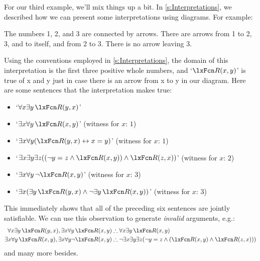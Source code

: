 For our third example, we'll mix things up a bit. In \cref{s:Interpretations}, we described how we can present some interpretations using diagrams. For example:
\begin{center}
	\begin{arialabel}{The numbers 1, 2, and 3 are connected by arrows. There are arrows from 1 to 2, 3, and to itself, and from 2 to 3. There is no arrow leaving 3.}
\end{arialabel}
\end{center}
Using the conventions employed in \cref{s:Interpretations}, the domain of this interpretation is the first three positive whole numbers, and `$\atom{R}{x,y}$' is true of x and y just in case there is an arrow from x to y in our diagram. Here are some sentences that the interpretation makes true:
\begin{itemize}
	\item `$\forall x \exists y\, \atom{R}{y,x}$' 
	\item `$\exists x \forall y\, \atom{R}{x,y}$' \hfill (witness for
	$x$: $1$)
	\item `$\exists x \forall y (\atom{R}{y,x} \eiff x = y)$' \hfill (witness for
	$x$: $1$)
	\item `$\exists x \exists y \exists z ((\enot y = z \eand \atom{R}{x,y}) \eand \atom{R}{z,x})$' \hfill (witness for
	$x$: $2$)
	\item `$\exists x \forall y\, \enot \atom{R}{x,y}$' \hfill (witness for
	$x$: $3$)
	\item `$\exists x (\exists y\, \atom{R}{y,x} \eand \enot \exists y\, \atom{R}{x,y})$' \hfill (witness for
	$x$: $3$)
\end{itemize}
This immediately shows that all of the preceding six sentences are jointly satisfiable. We can use this observation to generate \emph{invalid} arguments, e.g.:
\begin{align*}
	\forall x \exists y\, \atom{R}{y,x}, \exists x \forall y\, \atom{R}{x,y}  &\therefore  \forall x \exists y\, \atom{R}{x,y}\\
	\exists x \forall y\, \atom{R}{x,y}, \exists x \forall y \enot \atom{R}{x,y} & \therefore \enot \exists x \exists y \exists z (\enot y = z \eand (\atom{R}{x,y} \eand \atom{R}{z,x}))
\end{align*}
and many more besides.


